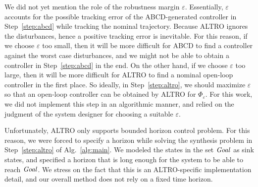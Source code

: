 We did not yet mention the role of the robustness margin $\varepsilon$.
Essentially, $\varepsilon$ accounts for the possible tracking error of the ABCD-generated controller in Step~\ref{step:abcd} while tracking the nominal trajectory.
Because ALTRO ignores the disturbances, hence a positive tracking error is inevitable.
For this reason, if we choose $\varepsilon$ too small, then it will be more difficult for ABCD to find a controller against the worst case disturbances, and we might not be able to obtain a controller in Step~\ref{step:abcd} in the end.
On the other hand, if we choose $\varepsilon$ too large, then it will be more difficult for ALTRO to find a nominal open-loop controller in the first place.
So ideally, in Step~\ref{step:altro}, we should maximize $\varepsilon$ so that an open-loop controller can be obtained by ALTRO for $\Phi_\varepsilon$.
For this work, we did not implement this step in an algorithmic manner, and relied on the judgment of the system designer for choosing a suitable $\varepsilon$.

\begin{remark}
	Unfortunately, ALTRO only supports bounded horizon control problem.
	For this reason, we were forced to specify a horizon while solving the synthesis problem in Step~\ref{step:altro} of Alg.~\ref{alg:main}.
	We modeled the states in the set $\mathit{Goal}$ as sink states, and specified a horizon that is long enough for the system to be able to reach $\mathit{Goal}$.
	We stress on the fact that this is an ALTRO-specific implementation detail, and our overall method does not rely on a fixed time horizon.
\end{remark}

